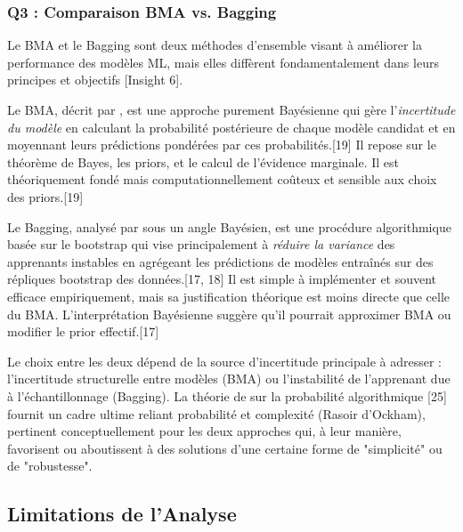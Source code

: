 \documentclass[11pt,a4paper]{article}
\begin{document}
\subsubsection{Q3 : Comparaison BMA vs. Bagging}
Le BMA et le Bagging sont deux méthodes d'ensemble visant à améliorer la performance des modèles ML, mais elles diffèrent fondamentalement dans leurs principes et objectifs [Insight 6].

Le BMA, décrit par \citet{Wasserman2000}, est une approche purement Bayésienne qui gère l'\textit{incertitude du modèle} en calculant la probabilité postérieure de chaque modèle candidat et en moyennant leurs prédictions pondérées par ces probabilités.[19] Il repose sur le théorème de Bayes, les priors, et le calcul de l'évidence marginale. Il est théoriquement fondé mais computationnellement coûteux et sensible aux choix des priors.[19]

Le Bagging, analysé par \citet{Domingos1997} sous un angle Bayésien, est une procédure algorithmique basée sur le bootstrap qui vise principalement à \textit{réduire la variance} des apprenants instables en agrégeant les prédictions de modèles entraînés sur des répliques bootstrap des données.[17, 18] Il est simple à implémenter et souvent efficace empiriquement, mais sa justification théorique est moins directe que celle du BMA. L'interprétation Bayésienne suggère qu'il pourrait approximer BMA ou modifier le prior effectif.[17]

Le choix entre les deux dépend de la source d'incertitude principale à adresser : l'incertitude structurelle entre modèles (BMA) ou l'instabilité de l'apprenant due à l'échantillonnage (Bagging). La théorie de \citet{Solomonoff1964} sur la probabilité algorithmique [25] fournit un cadre ultime reliant probabilité et complexité (Rasoir d'Ockham), pertinent conceptuellement pour les deux approches qui, à leur manière, favorisent ou aboutissent à des solutions d'une certaine forme de "simplicité" ou de "robustesse".

\subsection{Limitations de l'Analyse}
\end{document}
